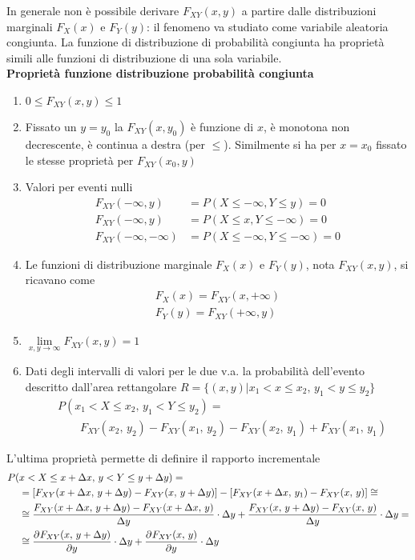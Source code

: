 In generale non è possibile derivare $F_{XY}(x,y)$ a partire dalle distribuzioni marginali $F_X(x)$ e $F_Y(y)$: il fenomeno va studiato come variabile aleatoria congiunta.
La funzione di distribuzione di probabilità congiunta ha proprietà simili alle funzioni di distribuzione di una sola variabile.\\

\textbf{Proprietà funzione distribuzione probabilità congiunta}
\begin{enumerate}
\item $0\leq F_{XY}(x,y)\leq 1$
\item Fissato un $y=y_0$ la $F_{XY}(x,y_0)$ è funzione di $x$, è monotona non decrescente, è continua a destra (per $\leq$).
Similmente si ha per $x=x_0$ fissato le stesse proprietà per $F_{XY}(x_0,y)$
\item Valori per eventi nulli
\[\begin{split}
F_{XY}(-\infty,y)&=P(X\leq -\infty,Y\leq y)=0 \\
F_{XY}(-\infty,y)&=P(X\leq x,Y\leq -\infty)=0 \\
F_{XY}(-\infty,-\infty)&=P(X\leq -\infty,Y\leq -\infty)=0
\end{split}\]
\item Le funzioni di distribuzione marginale $F_X(x)$ e $F_Y(y)$, nota $F_{XY}(x,y)$, si ricavano come
\[\begin{split}
F_X(x)=F_{XY}(x,+\infty)\\F_Y(y)=F_{XY}(+\infty,y)
\end{split}\]
\item $\lim\limits_{x,y\to\infty}F_{XY}(x,y)=1$
\item Dati degli intervalli di valori per le due v.a. la probabilità dell'evento descritto dall'area rettangolare $R=\{(x,y)|x_1<x\leq x_2,\, y_1<y\leq y_2\}$
\[\begin{split}
&P(x_1<X\leq x_2,\,y_1<Y\leq y_2)=\\&\qquad F_{XY}(x_2,\,y_2)-F_{XY}(x_1,\,y_2)-F_{XY}(x_2,\,y_1)+F_{XY}(x_1,\,y_1)\end{split}\]
\end{enumerate}
L'ultima proprietà permette di definire il rapporto incrementale \[\begin{split}P(&x<X\leq x+\Delta x,\,y<Y\leq y+\Delta y)=\\
&=\left[F_{XY}(x+\Delta x,\,y+\Delta y)-F_{XY}(x,\,y+\Delta y)\right]-\left[F_{XY}(x+\Delta x,\,y_1)-F_{XY}(x,\,y)\right]\cong\\
&\cong\frac{F_{XY}(x+\Delta x,\,y+\Delta y)-F_{XY}(x+\Delta x,\,y)}{\Delta y}\cdot\Delta y+\frac{F_{XY}(x,\,y+\Delta y)-F_{XY}(x,\,y)}{\Delta y}\cdot\Delta y=\\
&\cong\frac{\partial^{}F_{XY}(x,\,y+\Delta y)}{\partial y^{}}\cdot\Delta y+\frac{\partial^{}F_{XY}(x,\,y)}{\partial y^{}}\cdot\Delta y
\end{split}\]
